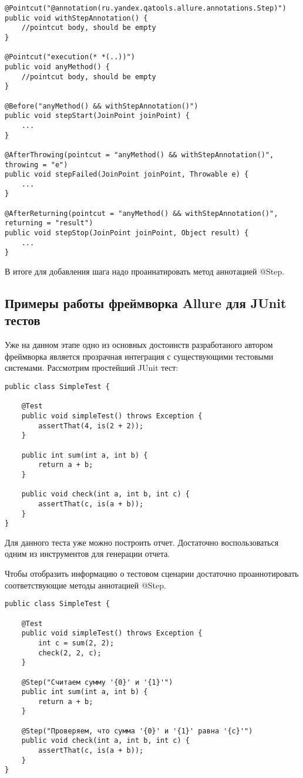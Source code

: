 \begin{lstlisting}
@Pointcut("@annotation(ru.yandex.qatools.allure.annotations.Step)")
public void withStepAnnotation() {
    //pointcut body, should be empty
}

@Pointcut("execution(* *(..))")
public void anyMethod() {
    //pointcut body, should be empty
}

@Before("anyMethod() && withStepAnnotation()")
public void stepStart(JoinPoint joinPoint) {
    ...
}

@AfterThrowing(pointcut = "anyMethod() && withStepAnnotation()", throwing = "e")
public void stepFailed(JoinPoint joinPoint, Throwable e) {
    ...
}

@AfterReturning(pointcut = "anyMethod() && withStepAnnotation()", returning = "result")
public void stepStop(JoinPoint joinPoint, Object result) {
    ...
}
\end{lstlisting}


В итоге для добавления шага надо проаннатировать метод аннотацией @Step. 

\newpage
\subsection{Примеры работы фреймворка Allure для JUnit тестов}

Уже на данном этапе одно из основных достоинств разработаного автором фреймворка является прозрачная интеграция с существующими тестовыми системами. Рассмотрим простейший JUnit тест:
 
\begin{lstlisting}
public class SimpleTest {

    @Test
    public void simpleTest() throws Exception {
        assertThat(4, is(2 + 2));
    }
    
    public int sum(int a, int b) {
		return a + b;
	}    
    
    public void check(int a, int b, int c) {
    	assertThat(c, is(a + b));	
    }
}
\end{lstlisting}

Для данного теста уже можно построить отчет. Достаточно воспользоваться одним из инструментов для генерации отчета.

Чтобы отобразить информацию о тестовом сценарии достаточно проаннотировать соответствующие методы аннотацией @Step.

\begin{lstlisting}
public class SimpleTest {

    @Test
    public void simpleTest() throws Exception {
        int c = sum(2, 2);
        check(2, 2, c);
    }
    
    @Step("Считаем сумму '{0}' и '{1}'")
    public int sum(int a, int b) {
		return a + b;
	}    
    
    @Step("Проверяем, что сумма '{0}' и '{1}' равна '{c}'")
    public void check(int a, int b, int c) {
    	assertThat(c, is(a + b));	
    }
}
\end{lstlisting}


